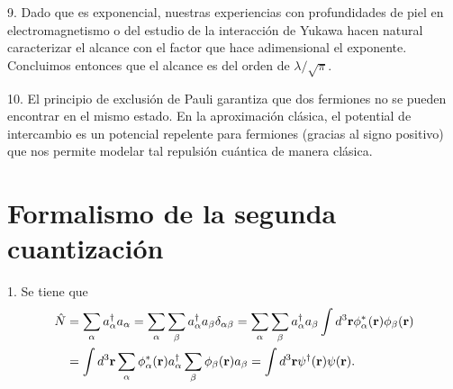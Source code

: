 \documentclass{article}
\begin{document}
9. Dado que es exponencial, nuestras experiencias con profundidades de piel en electromagnetismo o del estudio de la interacción de Yukawa hacen natural caracterizar el alcance con el factor que hace adimensional el exponente. Concluimos entonces que el alcance es del orden de $\lambda/\sqrt{\pi}$.

10. El principio de exclusión de Pauli garantiza que dos fermiones no se pueden encontrar en el mismo estado. En la aproximación clásica, el potential de intercambio es un potencial repelente para fermiones (gracias al signo positivo) que nos permite modelar tal repulsión cuántica de manera clásica.  

\section*{Formalismo de la segunda cuantización}

1. Se tiene que
\begin{align}
\begin{split}
\hat{N}&=\sum_\alpha a^\dagger_\alpha a_\alpha=\sum_\alpha \sum_\beta a^\dagger_\alpha a_\beta\delta_{\alpha\beta}=\sum_\alpha \sum_\beta a^\dagger_\alpha a_\beta\int d^3\vb{r}\phi^*_\alpha(\vb{r})\phi_\beta(\vb{r})\\
&=\int d^3\vb{r}\sum_\alpha \phi_\alpha^*(\vb{r})a_\alpha^\dagger\sum_\beta\phi_\beta(\vb{r})a_\beta=\int d^3\vb{r}\psi^\dagger (\vb{r})\psi(\vb{r}).
\end{split}
\end{align}
\end{document}
